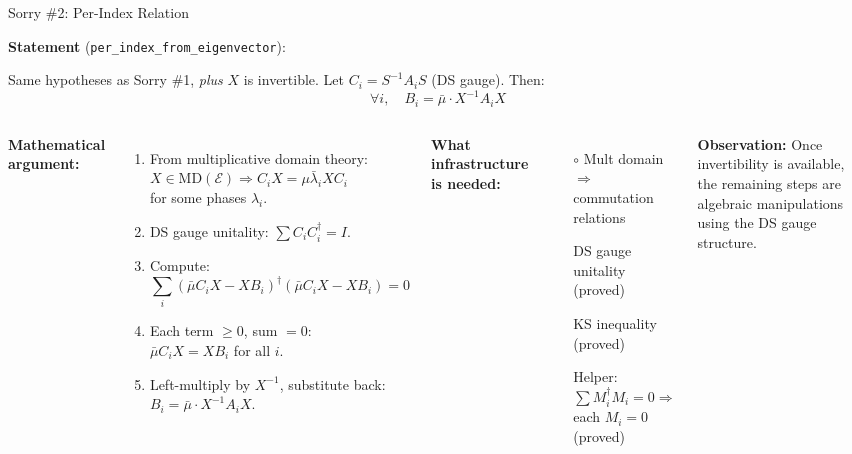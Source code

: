 \documentclass[aspectratio=169,10pt]{beamer}
\begin{document}
\begin{frame}{Sorry \#2: Per-Index Relation}
    \vspace{-0.5em}

    \textbf{\textcolor{softred}{Statement}} (\texttt{per\_index\_from\_eigenvector}):

    {\small
    Same hypotheses as Sorry \#1, \emph{plus} $X$ is invertible.
    Let $C_i = S^{-1}A_iS$ (DS gauge). Then:
    \[
        \forall i, \quad B_i = \bar\mu \cdot X^{-1} A_i X
    \]}

    \vspace{0.1em}
    \begin{columns}[T]
        \textbf{Mathematical argument:}
        \begin{enumerate}\itemsep0.1em\small
            \item From multiplicative domain theory:\\
                $X \in \mathrm{MD}(\mathcal{E}) \Rightarrow C_i X = \mu \bar\lambda_i X C_i$\\
                for some phases $\lambda_i$.
            \item DS gauge unitality: $\sum C_i C_i^\dagger = I$.
            \item Compute:
                {\scriptsize
                \[
                    \sum_i (\bar\mu C_i X - X B_i)^\dagger(\bar\mu C_i X - X B_i) = 0
                \]}
            \item Each term $\geq 0$, sum $= 0$:\\
                $\bar\mu C_i X = X B_i$ for all $i$.
            \item Left-multiply by $X^{-1}$, substitute back:\\
                $B_i = \bar\mu \cdot X^{-1} A_i X$.
        \end{enumerate}

        \textbf{What infrastructure is needed:}
        \begin{itemize}\itemsep0.1em\small
            \item[\textcolor{amber}{$\circ$}] Mult domain $\Rightarrow$ commutation relations
            \item[\textcolor{leangreen}{\checkmark}] DS gauge unitality (proved)
            \item[\textcolor{leangreen}{\checkmark}] KS inequality (proved)
            \item[\textcolor{leangreen}{\checkmark}] Helper: $\sum M_i^\dagger M_i = 0 \Rightarrow$ each $M_i = 0$ (proved)
        \end{itemize}

        \vspace{0.3em}
        {\small\textbf{Observation:} Once invertibility is available, the remaining steps are
        algebraic manipulations using the DS gauge structure.}
    \end{columns}
\end{frame}
\end{document}
